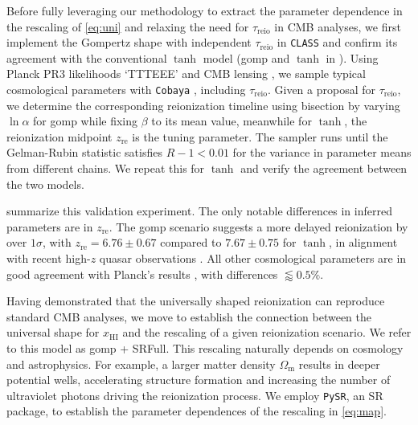 \documentclass[12pt, a4paper]{article}
\newcommand{\Omegam}{\Omega_\mathrm{m}}
\newcommand{\HI}{\mathrm{HI}}
\newcommand{\re}{\mathrm{re}}
\newcommand{\reio}{\mathrm{reio}}
\newcommand{\ap}{\alpha}
\begin{document}
Before fully leveraging our methodology to extract the parameter
dependence in the rescaling of \cref{eq:uni} and relaxing the need for
$\tau_\reio$ in CMB analyses, we first implement the Gompertz shape with
independent $\tau_\reio$ in \texttt{CLASS} and confirm its agreement
with the conventional $\tanh$ model (gomp and $\tanh$ in
).
Using Planck PR3 likelihoods `TTTEEE' \cite{Planck2020c} and CMB lensing
\cite{Planck2020d}, we sample typical cosmological parameters with
\texttt{Cobaya} \cite{Torrado2020}, including $\tau_\reio$.
Given a proposal for $\tau_\reio$, we determine the corresponding
reionization timeline using bisection by varying $\ln\ap$ for gomp
while fixing $\beta$ to its mean value,
meanwhile for $\tanh$, the reionization midpoint $z_\re$ is the tuning
parameter.
The sampler runs until the Gelman-Rubin statistic \cite{Gelman1992}
satisfies $R - 1 < 0.01$ for the variance in parameter means from
different chains.
We repeat this for $\tanh$ and verify the agreement between the two
models.

 summarize this validation experiment.
The only notable differences in inferred parameters are in $z_\re$.
The gomp scenario suggests a more delayed reionization by over
$1\sigma$, with $z_\re = 6.76 \pm 0.67$ compared to $7.67 \pm 0.75$ for
$\tanh$, in alignment with recent high-$z$ quasar observations
\cite{Keating2020}.
All other cosmological parameters are in good agreement with Planck's
results \cite{Planck2020a}, with differences $\lessapprox 0.5 \%$.

Having demonstrated that the universally shaped reionization can
reproduce standard CMB analyses, we move to establish the connection
between the universal shape for $x_\HI$ and the rescaling of a given
reionization scenario.
We refer to this model as gomp + SRFull.
This rescaling naturally depends on cosmology and astrophysics.
For example, a larger matter density $\Omegam$ results in deeper
potential wells, accelerating structure formation and increasing the
number of ultraviolet photons driving the reionization process.
We employ \texttt{PySR}, an SR package, to establish the parameter
dependences of the rescaling in \cref{eq:map}.
\end{document}

